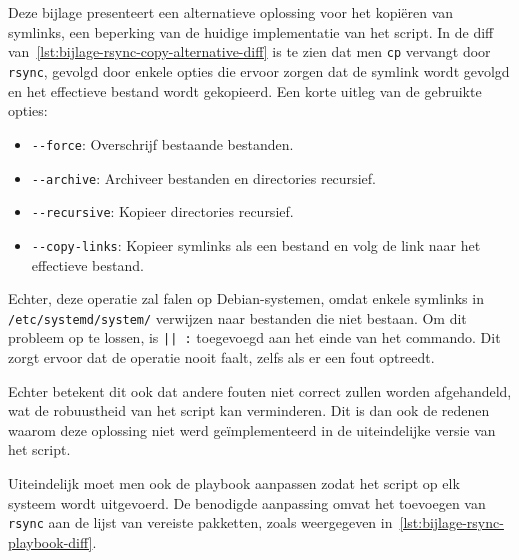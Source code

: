 
\chapter{}
\label{ch:bijlage_symlink_kopieren_met_rsync}

Deze bijlage presenteert een alternatieve oplossing voor het kopi\"eren van symlinks, een beperking van de huidige implementatie van het script.
In de diff van~\ref{lst:bijlage-rsync-copy-alternative-diff} is te zien dat men \texttt{cp} vervangt door \texttt{rsync}, gevolgd door enkele opties die ervoor zorgen dat de symlink wordt gevolgd en het effectieve bestand wordt gekopieerd.
Een korte uitleg van de gebruikte opties:

\begin{itemize}
  \item \texttt{-{}-force}: Overschrijf bestaande bestanden.
  \item \texttt{-{}-archive}: Archiveer bestanden en directories recursief.
  \item \texttt{-{}-recursive}: Kopieer directories recursief.
  \item \texttt{-{}-copy-links}: Kopieer symlinks als een bestand en volg de link naar het effectieve bestand.
\end{itemize}

Echter, deze operatie zal falen op Debian-systemen, omdat enkele symlinks in\\ \texttt{/etc/systemd/system/} verwijzen naar bestanden die niet bestaan.
Om dit probleem op te lossen, is \texttt{|| :} toegevoegd aan het einde van het commando.
Dit zorgt ervoor dat de operatie nooit faalt, zelfs als er een fout optreedt.

Echter betekent dit ook dat andere fouten niet correct zullen worden afgehandeld, wat de robuustheid van het script kan verminderen.
Dit is dan ook de redenen waarom deze oplossing niet werd ge\"implementeerd in de uiteindelijke versie van het script.

Uiteindelijk moet men ook de playbook aanpassen zodat het script op elk systeem wordt uitgevoerd.
De benodigde aanpassing omvat het toevoegen van \texttt{rsync} aan de lijst van vereiste pakketten, zoals weergegeven in~\ref{lst:bijlage-rsync-playbook-diff}.


